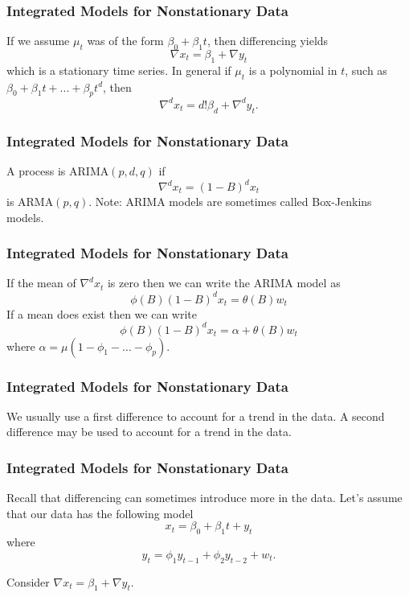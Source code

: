\documentclass[%
xcolor=pdftex]{beamer}
\begin{document}
\begin{frame}
\frametitle{Integrated Models for Nonstationary Data}

If we assume $\mu_t$ was of the form $\beta_0+\beta_1 t$, then differencing yields
$$
\nabla x_t =\beta_1 + \nabla y_t
$$
which is a stationary time series.  In general if $\mu_t$ is a polynomial in $t$, such as $\beta_0+\beta_1 t+...+\beta_p t^d$, then
$$
\nabla^d x_t =d! \beta_d + \nabla^d y_t.
$$

\end{frame}

\begin{frame}
\frametitle{Integrated Models for Nonstationary Data}

A process is ARIMA$(p,d,q)$ if
$$
\nabla^d x_t=(1-B)^d x_t
$$
is ARMA$(p,q)$. Note: ARIMA models are sometimes called Box-Jenkins models.

\end{frame}

\begin{frame}
\frametitle{Integrated Models for Nonstationary Data}

If the mean of $\nabla^d x_t$ is zero then we can write the ARIMA model as
\begin{equation}
\phi(B)(1-B)^d x_t = \theta(B) w_t
\end{equation}
If a mean does exist then we can write
\begin{equation}
\phi(B)(1-B)^d x_t = \alpha + \theta(B) w_t
\end{equation}
where $\alpha=\mu(1-\phi_1-...-\phi_p)$.

\end{frame}

\begin{frame}
\frametitle{Integrated Models for Nonstationary Data}

We usually use a first difference to account for a \underline{\hspace{15 mm}} trend in the data. A second difference may be used to account for a \underline{\hspace{15 mm}} trend in the data.

\end{frame}

\begin{frame}
\frametitle{Integrated Models for Nonstationary Data}

Recall that differencing can sometimes introduce more \underline{\hspace{25 mm}} in the data. Let's assume that our data has the following model
$$
x_t =\beta_0+\beta_1 t + y_t
$$
where
$$
y_t=\phi_1 y_{t-1}+\phi_2 y_{t-2}+w_t.
$$

Consider $\nabla x_t=\beta_1+ \nabla y_t$.

\end{frame}
\end{document}
